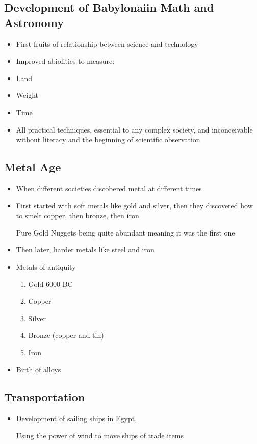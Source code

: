 \documentclass{article}
\begin{document}
\subsection{Development of Babylonaiin Math and Astronomy}
\begin{itemize}
  \item First fruits of relationship between science and technology
  \item Improved abiolities to measure:
  \item Land
  \item Weight
  \item Time
  \item All practical techniques, essential to any complex society,
    and inconceivable without literacy and the beginning of scientific observation
\end{itemize}

\subsection{Metal Age}
\begin{itemize}
  \item When different societies discobered metal at different times
  \item First started with soft metals like gold and silver,
    then they discovered how to smelt copper, then bronze, then iron

    Pure Gold Nuggets being quite abundant meaning it was the first one
  \item Then later, harder metals like steel and iron
  \item Metals of antiquity
    \begin{enumerate}
      \item Gold 6000 BC
      \item Copper
      \item Silver
      \item Bronze (copper and tin)
      \item Iron
    \end{enumerate}
    \item Birth of alloys
\end{itemize}

\subsection{Transportation}
\begin{itemize}
  \item Development of sailing ships in Egypt,

    Using the power of wind to move ships of trade items
\end{itemize}
\end{document}
